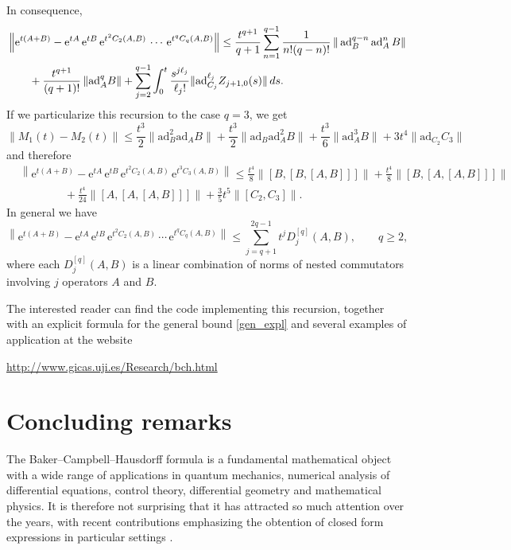 \documentclass[11pt]{article}
\newcommand{\e}{\ensuremath{\mathrm{e}}}
\newcommand{\ad}{\ensuremath{\mathrm{ad}}}
\begin{document}
In consequence, 
\[ 
\aligned 
&  \left\| \e^{t (A+B)}  - \e^{t A} \, \e^{t B} \, \e^{t^2 C_2(A,B)} \, \cdots \, \e^{t^q C_q(A,B)} \right\|
\le   
\frac{t^{q+1}}{q+1}\sum_{n=1}^{q-1}  \frac{1}{n!(q-n)!}\,\|
\operatorname{ad}^{q-n}_{B} \operatorname{ad}_{A}^{n}B \|
\\& \qquad+
\frac{t^{q+1}}{(q+1)!}\, \|\ad^q_{A} B\|  + \sum_{j=2}^{q-1}\int_0^t   \frac{s^{j \ell_j}}{\ell_j!} \|\ad_{C_j}^{\ell_j} Z_{j+1,0}(s)\| \, ds.
\endaligned
\] 
If we particularize this recursion to the case $q=3$, we get   
\[
  \|M_1(t) - M_2(t)\|  \le \frac{t^3}{2} \|\ad_B^2 \ad_A B\|  + \frac{t^3}{2} \|\ad_B \ad_A^2 B\|  + \frac{t^3}{6} \|\ad_A^3 B\| 
  + 3 t^4 \|\ad_{C_2} C_3\|
\] 
and therefore
\[
\begin{aligned}
 &  \left\| \e^{t (A+B)} -  \e^{t A} \, \e^{t B} \, \e^{t^2 C_2(A,B)} \,  \e^{t^3 C_3(A,B)} \right\| \le \frac{t^4}{8} \|[B,[B,[A,B]]]\| + \frac{t^4}{8} \|[B,[A,[A,B]]]\| \\
 & \qquad\qquad + \frac{t^4}{24} \|[A,[A,[A,B]]]\| + \frac{3}{5} t^5 \|[C_2,C_3]\|.
\end{aligned} 
\]
In general we have
\begin{equation} \label{gen_expl}
  \left\| \e^{t (A+B)} - \e^{t A} \, \e^{t B} \, \e^{t^2 C_2(A,B)} \, \cdots \, \e^{t^q C_q(A,B)} \right\|
   \le \sum_{j=q+1}^{2q-1} t^j D_j^{[q]}(A,B), \qquad q \ge 2,
\end{equation}
where each $D_j^{[q]}(A,B)$ is a linear combination of norms of nested commutators involving $j$ operators $A$ and $B$.  


The interested reader can find the code implementing this recursion, together with an explicit formula for the general bound \eqref{gen_expl}
and several examples of application at the website
\begin{center}
  \url{http://www.gicas.uji.es/Research/bch.html}
\end{center}




\section{Concluding remarks}
\label{conclusions}

The Baker--Campbell--Hausdorff formula is a fundamental mathematical object with a wide range of applications in quantum mechanics, numerical 
analysis of differential equations, control theory, differential geometry and mathematical physics. 
It is therefore not surprising that it has attracted so much attention over the years, with recent contributions emphasizing the obtention of closed form
expressions in particular settings \cite{moodie21aep}.
\end{document}
